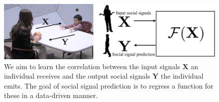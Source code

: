 \begin{figure}[t]
	\centering
	\includegraphics[width=\linewidth]{ssp_fig/intro}
	\caption{We aim to learn the correlation between the input signals $\mathbf{X}$ an individual receives and the output social signals $\mathbf{Y}$ the individual emits. The goal of social signal prediction is to regress a function for these in a data-driven manner.}
	\label{fig:ssp_intro}
\end{figure}




        









